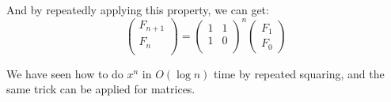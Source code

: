 \documentclass[12pt]{report}
\begin{document}
\begin{enumerate}[label=\textbf{\arabic*.}]
  And by repeatedly applying this property, we can get:
  \[
  \begin{pmatrix}
    F_{n+1} \\
    F_n \\
  \end{pmatrix}
  =
  \begin{pmatrix}
    1 & 1 \\
    1 & 0 \\
  \end{pmatrix}^n
  \begin{pmatrix}
    F_1 \\
    F_{0}
  \end{pmatrix}
  \]

  We have seen how to do $x^n$ in $O(\log n)$ time by repeated squaring, and the same trick can be applied for matrices.

  \end{enumerate}
\end{document}
